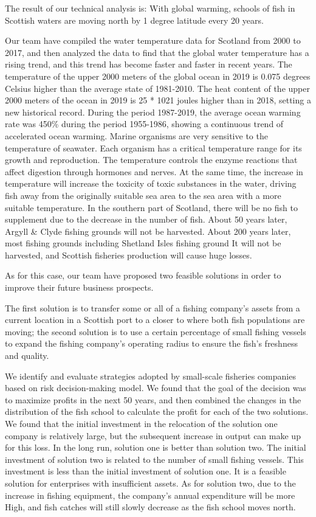 \documentclass{mcmthesis}
\numberwithin{figure}{section}
\numberwithin{table}{section}
\begin{document}
The result of our technical analysis is: With global warming, schools of fish in Scottish waters are moving north by 1 degree latitude every 20 years.

Our team have compiled the water temperature data for Scotland from 2000 to 2017, and then analyzed the data to find that the global water temperature has a rising trend, and this trend has become faster and faster in recent years. The temperature of the upper 2000 meters of the global ocean in 2019 is 0.075 degrees Celsius higher than the average state of 1981-2010. The heat content of the upper 2000 meters of the ocean in 2019 is 25 * 1021 joules higher than in 2018, setting a new historical record. During the period 1987-2019, the average ocean warming rate was 450\% during the period 1955-1986, showing a continuous trend of accelerated ocean warming. Marine organisms are very sensitive to the temperature of seawater. Each organism has a critical temperature range for its growth and reproduction. The temperature controls the enzyme reactions that affect digestion through hormones and nerves. At the same time, the increase in temperature will increase the toxicity of toxic substances in the water, driving fish away from the originally suitable sea area to the sea area with a more suitable temperature. In the southern part of Scotland, there will be no fish to supplement due to the decrease in the number of fish. About 50 years later, Argyll \& Clyde fishing grounds will not be harvested. About 200 years later, most fishing grounds including Shetland Isles fishing ground It will not be harvested, and Scottish fisheries production will cause huge losses.

As for this case, our team have proposed two feasible solutions  in order to improve their future business prospects.

The first solution is to transfer some or all of a fishing company's assets from a current location in a  Scottish port to a closer to where both fish populations are moving; the second solution is to use a certain percentage of small fishing vessels to expand the fishing company's operating radius to ensure the fish's freshness and quality. 

We identify and evaluate strategies adopted by small-scale fisheries companies based on  risk decision-making model. We found that the goal of the decision was to maximize profits in the next 50 years, and then combined the changes in the distribution of the fish school to calculate the profit for each of the two solutions. We found that the initial investment in the relocation of the solution one company is relatively large, but the subsequent increase in output can make up for this loss. In the long run, solution one is better than solution two. The initial investment of solution two is related to the number of small fishing vessels. This investment is less than the initial investment of solution one. It is a feasible solution for enterprises with insufficient assets. As for solution two, due to the increase in fishing equipment, the company's annual  expenditure will be more High, and fish catches will still slowly decrease as the fish school moves north. 
\end{document}
